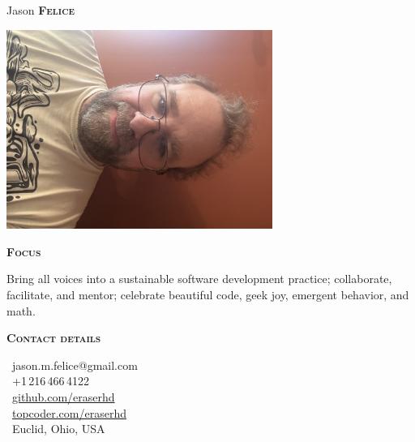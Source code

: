 \documentclass[11pt, letterpaper]{article}
\newcommand{\headleft}[1]{\vspace*{3ex}\textsc{\textbf{#1}}\par%
    \vspace*{-1.5ex}\hrulefill\par\vspace*{0.7ex}}
\begin{document}
\setlength{\topskip}{0pt}
\setlength{\parindent}{0pt}
\setlength{\parskip}{0pt}
\setlength{\fboxsep}{0pt}
\pagestyle{empty}
\raggedbottom

\begin{minipage}[t]{0.33\textwidth} %
\colorbox{cvblue}{\begin{minipage}[t][5mm][t]{\textwidth}\null\hfill\null\end{minipage}}

\vspace{-.25ex} %
\colorbox{cvblue!90}{\color{white}  %
\textwidth\relax%
\begin{minipage}[t][\dimexpr\textheight-5mm\relax][t]{0.82\textwidth}
\raggedright
\vspace*{2.5ex}

\hfill\Huge{Jason \textbf{\textsc{Felice}}} \normalsize

\null\hfill\includegraphics[width=0.65\textwidth]{profile.jpg}\hfill\null

\vspace*{0.5ex} %

\headleft{Focus}

Bring all voices into a sustainable software development practice;
collaborate, facilitate, and mentor; celebrate beautiful code, geek joy,
emergent behavior, and math.

\headleft{Contact details}
\makebox[1em][c]{\faAt}\ jason.m.felice@gmail.com \\[0.5ex]
\makebox[1em][c]{\faPhone}\ +1\,216\,466\,4122 \\[0.5ex]
\makebox[1em][c]{\faGithub}\ \href{https://github.com/eraserhd}{github.com/eraserhd} \\[0.5ex]
\makebox[1em][c]{\faCode}\ \href{https://www.topcoder.com/members/eraserhd}{topcoder.com/eraserhd} \\[0.5ex]
\makebox[1em][c]{\faMapMarker}\ Euclid, Ohio, USA


\end{minipage}}
\end{minipage}
\end{document}
